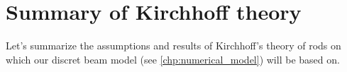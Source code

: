 %
%

%

\clearpage
\section{Summary of Kirchhoff theory}
Let's summarize the assumptions and results of Kirchhoff's theory of rods on which our discret beam model (see \cref{chp:numerical_model}) will be based on.

